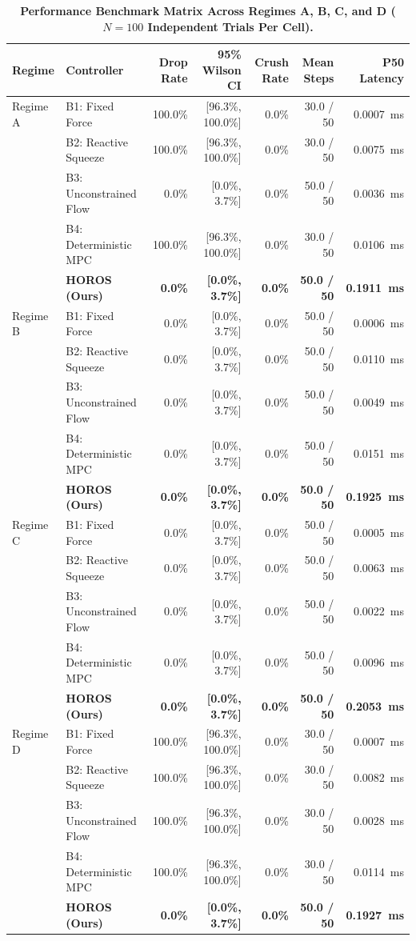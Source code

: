 \begin{table}[t]
\centering
\caption{\textbf{Performance Benchmark Matrix Across Regimes A, B, C, and D ($N=100$ Independent Trials Per Cell).}}
\label{tab:benchmarks}
\small
\begin{tabular}{llrrrrr}
\toprule
\textbf{Regime} & \textbf{Controller} & \textbf{Drop Rate} & \textbf{95\% Wilson CI} & \textbf{Crush Rate} & \textbf{Mean Steps} & \textbf{P50 Latency} \\
\midrule
Regime A & B1: Fixed Force & 100.0\% & [96.3\%, 100.0\%] & 0.0\% & 30.0 / 50 & 0.0007~ms \\
& B2: Reactive Squeeze & 100.0\% & [96.3\%, 100.0\%] & 0.0\% & 30.0 / 50 & 0.0075~ms \\
& B3: Unconstrained Flow & 0.0\% & [0.0\%, 3.7\%] & 0.0\% & 50.0 / 50 & 0.0036~ms \\
& B4: Deterministic MPC & 100.0\% & [96.3\%, 100.0\%] & 0.0\% & 30.0 / 50 & 0.0106~ms \\
& \textbf{HOROS (Ours)} & \textbf{0.0\%} & \textbf{[0.0\%, 3.7\%]} & \textbf{0.0\%} & \textbf{50.0 / 50} & \textbf{0.1911~ms} \\
\midrule
Regime B & B1: Fixed Force & 0.0\% & [0.0\%, 3.7\%] & 0.0\% & 50.0 / 50 & 0.0006~ms \\
& B2: Reactive Squeeze & 0.0\% & [0.0\%, 3.7\%] & 0.0\% & 50.0 / 50 & 0.0110~ms \\
& B3: Unconstrained Flow & 0.0\% & [0.0\%, 3.7\%] & 0.0\% & 50.0 / 50 & 0.0049~ms \\
& B4: Deterministic MPC & 0.0\% & [0.0\%, 3.7\%] & 0.0\% & 50.0 / 50 & 0.0151~ms \\
& \textbf{HOROS (Ours)} & \textbf{0.0\%} & \textbf{[0.0\%, 3.7\%]} & \textbf{0.0\%} & \textbf{50.0 / 50} & \textbf{0.1925~ms} \\
\midrule
Regime C & B1: Fixed Force & 0.0\% & [0.0\%, 3.7\%] & 0.0\% & 50.0 / 50 & 0.0005~ms \\
& B2: Reactive Squeeze & 0.0\% & [0.0\%, 3.7\%] & 0.0\% & 50.0 / 50 & 0.0063~ms \\
& B3: Unconstrained Flow & 0.0\% & [0.0\%, 3.7\%] & 0.0\% & 50.0 / 50 & 0.0022~ms \\
& B4: Deterministic MPC & 0.0\% & [0.0\%, 3.7\%] & 0.0\% & 50.0 / 50 & 0.0096~ms \\
& \textbf{HOROS (Ours)} & \textbf{0.0\%} & \textbf{[0.0\%, 3.7\%]} & \textbf{0.0\%} & \textbf{50.0 / 50} & \textbf{0.2053~ms} \\
\midrule
Regime D & B1: Fixed Force & 100.0\% & [96.3\%, 100.0\%] & 0.0\% & 30.0 / 50 & 0.0007~ms \\
& B2: Reactive Squeeze & 100.0\% & [96.3\%, 100.0\%] & 0.0\% & 30.0 / 50 & 0.0082~ms \\
& B3: Unconstrained Flow & 100.0\% & [96.3\%, 100.0\%] & 0.0\% & 30.0 / 50 & 0.0028~ms \\
& B4: Deterministic MPC & 100.0\% & [96.3\%, 100.0\%] & 0.0\% & 30.0 / 50 & 0.0114~ms \\
& \textbf{HOROS (Ours)} & \textbf{0.0\%} & \textbf{[0.0\%, 3.7\%]} & \textbf{0.0\%} & \textbf{50.0 / 50} & \textbf{0.1927~ms} \\
\bottomrule
\end{tabular}
\end{table}

